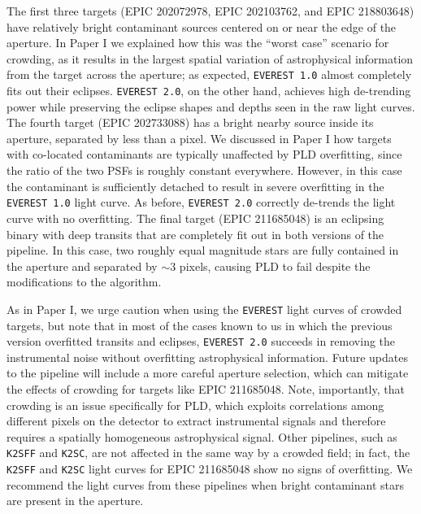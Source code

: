 \documentclass[]{aastex62}
\newcommand{\edited}[1]{{\color{red} #1}}
\begin{document}
The first three targets (EPIC 202072978, EPIC 202103762, and EPIC 218803648) have relatively bright
contaminant sources centered on or near the edge of the aperture. In Paper I we explained how this
was the ``worst case'' scenario for crowding, as it results in the largest spatial variation of
astrophysical information from the target across the aperture; as expected, \texttt{EVEREST 1.0}
almost completely fits out their eclipses. \texttt{EVEREST 2.0}, on the other hand, achieves high
de-trending power while preserving the eclipse shapes and depths seen in the raw light curves.
The fourth target (EPIC 202733088) has a bright nearby source inside its aperture, separated by
less than a pixel. We discussed in Paper I how targets with co-located contaminants are typically
unaffected by PLD overfitting, since the ratio of the two PSFs is roughly constant everywhere.
However, in this case the contaminant is sufficiently detached to result in severe overfitting
in the \texttt{EVEREST 1.0} light curve. As before, \texttt{EVEREST 2.0} correctly de-trends the light curve with
no overfitting. The final target (EPIC 211685048) is an eclipsing binary with deep transits that are completely
fit out in both versions of the pipeline. In this case, two roughly equal magnitude stars are
fully contained in the aperture and separated by ${\sim}3$ pixels, causing PLD to fail despite
the modifications to the algorithm.

As in Paper I, we urge caution when using the \texttt{EVEREST} light curves of crowded targets,
but note that in most of the cases known to us in which the previous version overfitted transits
and eclipses, \texttt{EVEREST 2.0} succeeds in removing the instrumental noise without overfitting
astrophysical information. Future updates to the pipeline will include a more careful aperture
selection, which can mitigate the effects of crowding for targets like EPIC 211685048. \edited{Note,
importantly, that crowding is an issue specifically for PLD, which exploits correlations among
different pixels on the detector to extract instrumental signals and therefore requires a spatially
homogeneous astrophysical signal. Other pipelines, such as \texttt{K2SFF} and \texttt{K2SC}, are not
affected in the same way by a crowded field; in fact, the \texttt{K2SFF} and \texttt{K2SC} light curves for EPIC 211685048
show no signs of overfitting. We recommend the light curves from these pipelines when
bright contaminant stars are present in the aperture.}
\end{document}
